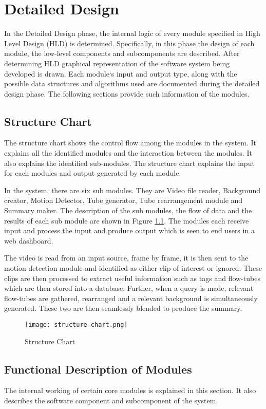 \chapter{Detailed Design}
In the Detailed Design phase, the internal logic of every module specified in High Level Design (HLD) is determined. Specifically, in this phase the design of each module, the low-level components and subcomponents are described. After determining HLD graphical representation of the software system being developed is drawn. Each module‘s input and output type, along with the possible data structures and algorithms used are documented during the detailed design phase. The following sections provide such information of the modules.

\section{Structure Chart}
The structure chart shows the control flow among the modules in the system. It explains all the identified modules and the interaction between the modules. It also explains the identified sub-modules. The structure chart explains the input for each modules and output generated by each module.

In the system, there are six sub modules. They are Video file reader, Background creator, Motion Detector, Tube generator, Tube rearrangement module and Summary maker. The description of the sub modules, the flow of data and the results of each sub module are shown in Figure \ref{img:structure-chart}. The modules each receive input and process the input and produce output which is seen to end users in a web dashboard.

The video is read from an input source, frame by frame, it is then sent to the motion detection module and identified as either clip of interest or ignored. These clips are then processed to extract useful information such as tags and flow-tubes which are then stored into a database. Further, when a query is made, relevant flow-tubes are gathered, rearranged and a relevant background is simultaneously generated. These two are then seamlessly blended to produce the summary.


\begin{figure}[H]
    \centering
    \texttt{[image: structure-chart.png]}
    \caption{Structure Chart}
    \label{img:structure-chart}
\end{figure}

\section{Functional Description of Modules}
The internal working of certain core modules is explained in this section. It also describes the software component and subcomponent of the system.

